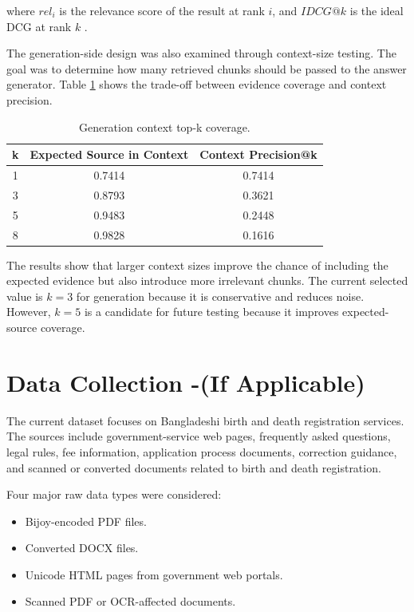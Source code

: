 where $rel_i$ is the relevance score of the result at rank $i$, and $IDCG@k$ is the ideal DCG at rank $k$ \cite{jarvelin2002ndcg}.

The generation-side design was also examined through context-size testing. The goal was to determine how many retrieved chunks should be passed to the answer generator. Table \ref{tab:topk_context} shows the trade-off between evidence coverage and context precision.

\begin{table}[h]
\centering
\caption{Generation context top-k coverage.}
\label{tab:topk_context}
\begin{tabular}{|c|c|c|}
\hline
\textbf{k} & \textbf{Expected Source in Context} & \textbf{Context Precision@k} \\
\hline
1 & 0.7414 & 0.7414 \\
\hline
3 & 0.8793 & 0.3621 \\
\hline
5 & 0.9483 & 0.2448 \\
\hline
8 & 0.9828 & 0.1616 \\
\hline
\end{tabular}
\end{table}

The results show that larger context sizes improve the chance of including the expected evidence but also introduce more irrelevant chunks. The current selected value is $k=3$ for generation because it is conservative and reduces noise. However, $k=5$ is a candidate for future testing because it improves expected-source coverage.

\section{Data Collection -(If Applicable)}

The current dataset focuses on Bangladeshi birth and death registration services. The sources include government-service web pages, frequently asked questions, legal rules, fee information, application process documents, correction guidance, and scanned or converted documents related to birth and death registration.

Four major raw data types were considered:

\begin{itemize}
    \item Bijoy-encoded PDF files.
    \item Converted DOCX files.
    \item Unicode HTML pages from government web portals.
    \item Scanned PDF or OCR-affected documents.
\end{itemize}

